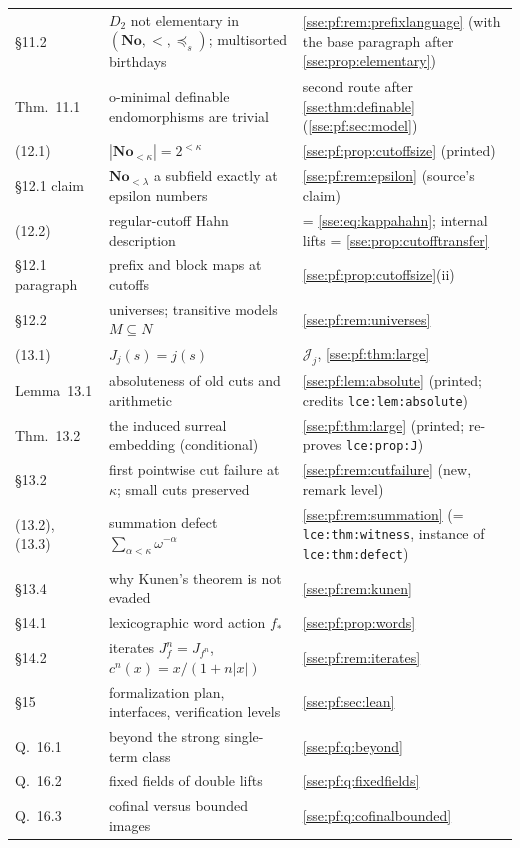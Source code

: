 \documentclass[11pt,a4paper]{article}
\numberwithin{equation}{section}
\theoremstyle{plain}
\theoremstyle{definition}
\theoremstyle{remark}
\newcommand{\No}{\mathbf{No}}
\newcommand{\pref}{\preccurlyeq_s}
\newcommand{\lbl}[1]{\nolinkurl{#1}}%
\begin{document}
\begin{longtable}{P{27mm}P{50mm}P{71mm}}
\S11.2 & $D_2$ not elementary in $(\No,<,\pref)$; multisorted birthdays & \cref{sse:pf:rem:prefixlanguage} (with the base paragraph after \cref{sse:prop:elementary}) \\
Thm.~11.1 & o-minimal definable endomorphisms are trivial & second route after \cref{sse:thm:definable} (\cref{sse:pf:sec:model}) \\
(12.1) & $|\No_{<\kappa}|=2^{<\kappa}$ & \cref{sse:pf:prop:cutoffsize} (printed) \\
\S12.1 claim & $\No_{<\lambda}$ a subfield exactly at epsilon numbers & \cref{sse:pf:rem:epsilon} (source's claim) \\
(12.2) & regular-cutoff Hahn description & = \eqref{sse:eq:kappahahn}; internal lifts = \cref{sse:prop:cutofftransfer} \\
\S12.1 paragraph & prefix and block maps at cutoffs & \cref{sse:pf:prop:cutoffsize}(ii) \\
\S12.2 & universes; transitive models $M\subseteq N$ & \cref{sse:pf:rem:universes} \\
(13.1) & $J_j(s)=j(s)$ & $\mathcal J_j$, \cref{sse:pf:thm:large} \\
Lemma~13.1 & absoluteness of old cuts and arithmetic & \cref{sse:pf:lem:absolute} (printed; credits \lbl{lce:lem:absolute}) \\
Thm.~13.2 & the induced surreal embedding (conditional) & \cref{sse:pf:thm:large} (printed; re-proves \lbl{lce:prop:J}) \\
\S13.2 & first pointwise cut failure at $\kappa$; small cuts preserved & \cref{sse:pf:rem:cutfailure} (new, remark level) \\
(13.2), (13.3) & summation defect $\sum_{\alpha<\kappa}\omega^{-\alpha}$ & \cref{sse:pf:rem:summation} (= \lbl{lce:thm:witness}, instance of \lbl{lce:thm:defect}) \\
\S13.4 & why Kunen's theorem is not evaded & \cref{sse:pf:rem:kunen} \\
\S14.1 & lexicographic word action $f_*$ & \cref{sse:pf:prop:words} \\
\S14.2 & iterates $J_f^n=J_{f^n}$, $c^n(x)=x/(1+n|x|)$ & \cref{sse:pf:rem:iterates} \\
\S15 & formalization plan, interfaces, verification levels & \cref{sse:pf:sec:lean} \\
Q.~16.1 & beyond the strong single-term class & \cref{sse:pf:q:beyond} \\
Q.~16.2 & fixed fields of double lifts & \cref{sse:pf:q:fixedfields} \\
Q.~16.3 & cofinal versus bounded images & \cref{sse:pf:q:cofinalbounded} \\

\end{longtable}
\end{document}
